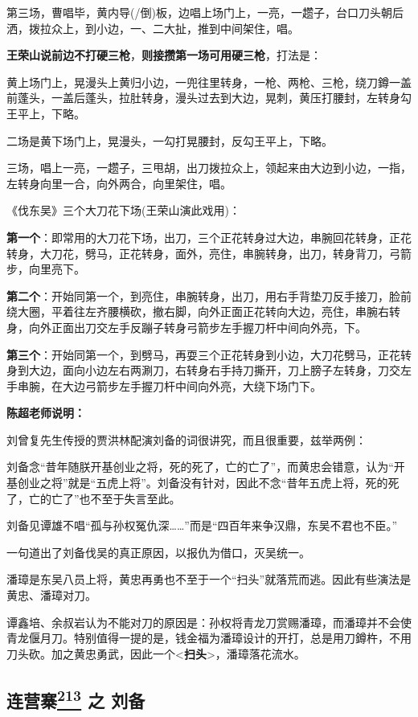 第三场，曹唱毕，黄内导(/倒)板，边唱上场门上，一亮，一趱子，台口刀头朝后洒，拨拉众上，到小边，一、二大扯，推到中间架住，唱。

\textbf{王荣山说前边不打硬三枪}，\textbf{则接攒第一场可用硬三枪}，打法是：

黄上场门上，晃漫头上黄归小边，一兜往里转身，一枪、两枪、三枪，绕刀鐏一盖前蓬头，一盖后蓬头，拉肚转身，漫头过去到大边，晃刺，黄压打腰封，左转身勾王平上，下略。

二场是黄下场门上，晃漫头，一勾打晃腰封，反勾王平上，下略。

三场，唱上一亮，一趱子，三甩胡，出刀拨拉众上，领起来由大边到小边，一指，左转身向里一合，向外两合，向里架住，唱。

《伐东吴》三个大刀花下场(王荣山演此戏用)：

\textbf{第一个}：即常用的大刀花下场，出刀，三个正花转身过大边，串腕回花转身，正花转身，大刀花，劈马，正花转身，面外，亮住，串腕转身，出刀，转身背刀，弓箭步，向里亮下。

\textbf{第二个}：开始同第一个，到亮住，串腕转身，出刀，用右手背垫刀反手接刀，脸前绕大圈，平着往左齐腰横砍，撤右脚，向外正面正花转向大边，亮住，串腕右转身，向外正面出刀交左手反蹦子转身弓箭步左手握刀杆中间向外亮，下。

\textbf{第三个}：开始同第一个，到劈马，再耍三个正花转身到小边，大刀花劈马，正花转身到大边，面向小边左右两涮刀，右转身右手持刀撕开，刀上膀子左转身，刀交左手串腕，在大边弓箭步左手握刀杆中间向外亮，大绕下场门下。

\textbf{陈超老师说明：}

刘曾复先生传授的贾洪林配演刘备的词很讲究，而且很重要，兹举两例：

刘备念``昔年随朕开基创业之将，死的死了，亡的亡了''，而黄忠会错意，认为``开基创业之将''就是``五虎上将''。刘备没有针对，因此不念``昔年五虎上将，死的死了，亡的亡了''也不至于失言至此。

刘备见谭雄不唱``孤与孙权冤仇深\ldots{}\ldots{}''而是``四百年来争汉鼎，东吴不君也不臣。''

一句道出了刘备伐吴的真正原因，以报仇为借口，灭吴统一。

潘璋是东吴八员上将，黄忠再勇也不至于一个``扫头''就落荒而逃。因此有些演法是黄忠、潘璋对刀。

谭鑫培、余叔岩认为不能对刀的原因是：孙权将青龙刀赏赐潘璋，而潘璋并不会使青龙偃月刀。特别值得一提的是，钱金福为潘璋设计的开打，总是用刀鐏杵，不用刀头砍。加之黄忠勇武，因此一个\textless{}\textbf{扫头}\textgreater{}，潘璋落花流水。

\hypertarget{ux8fdeux8425ux5be8-ux4e4b-ux5218ux5907}{%
\subsection{\texorpdfstring{连营寨\protect\hyperlink{fn213}{\textsuperscript{213}}
之
刘备}{连营寨213 之 刘备}}\label{ux8fdeux8425ux5be8-ux4e4b-ux5218ux5907}}

